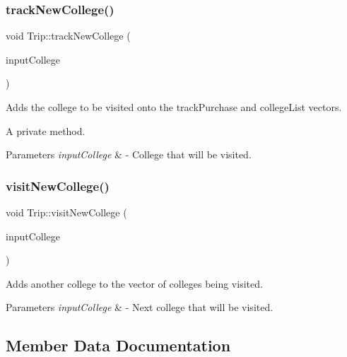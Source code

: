 \subsubsection{\texorpdfstring{track\+New\+College()}{trackNewCollege()}}
{\footnotesize\ttfamily void Trip\+::track\+New\+College (\begin{DoxyParamCaption}\item[{Q\+String}]{input\+College }\end{DoxyParamCaption})\hspace{0.3cm}{\ttfamily [private]}}



Adds the college to be visited onto the track\+Purchase and college\+List vectors. 

A private method.


\begin{DoxyParams}{Parameters}
{\em input\+College} & -\/ College that will be visited. \\
\hline
\end{DoxyParams}
\mbox{\label{class_trip_a58073e12498a5cb48d835a53609b0ca6}} 
\subsubsection{\texorpdfstring{visit\+New\+College()}{visitNewCollege()}}
{\footnotesize\ttfamily void Trip\+::visit\+New\+College (\begin{DoxyParamCaption}\item[{Q\+String}]{input\+College }\end{DoxyParamCaption})}



Adds another college to the vector of colleges being visited. 


\begin{DoxyParams}{Parameters}
{\em input\+College} & -\/ Next college that will be visited. \\
\hline
\end{DoxyParams}


\subsection{Member Data Documentation}
\mbox{\label{class_trip_a64029dbf999502ffe6517283a3e44214}} 

